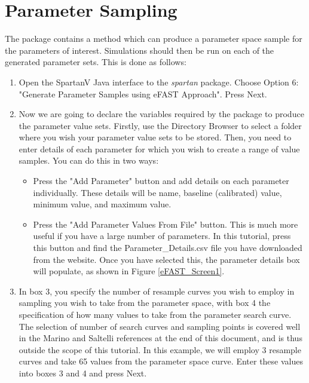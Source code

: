 \documentclass[a4paper,11pt]{article}
\begin{document}
\section{Parameter Sampling}
\noindent The package contains a method which can produce a parameter space sample for the parameters of interest. Simulations should then be run on each of the generated parameter sets.  This is done as follows:\\

\begin{enumerate}
\item Open the SpartanV Java interface to the \textit{spartan} package. Choose Option 6: "Generate Parameter Samples using eFAST Approach". Press Next.
\item Now we are going to declare the variables required by the package to produce the parameter value sets. Firstly, use the Directory Browser to select a folder where you wish your parameter value sets to be stored. Then, you need to enter details of each parameter for which you wish to create a range of value samples. You can do this in two ways:
\begin{itemize}
\item Press the "Add Parameter" button and add details on each parameter individually. These details will be name, baseline (calibrated) value, minimum value, and maximum value.
\item Press the "Add Parameter Values From File" button. This is much more useful if you have a large number of parameters. In this tutorial, press this button and find the Parameter\_Details.csv file you have downloaded from the website. Once you have selected this, the parameter details box will populate, as shown in Figure \ref{eFAST_Screen1}.
\end{itemize}

\item In box 3, you specify the number of resample curves you wish to employ in sampling you wish to take from the parameter space, with box 4 the specification of how many values to take from the parameter search curve. The selection of number of search curves and sampling points is covered well in the Marino and Saltelli references at the end of this document, and is thus outside the scope of this tutorial. In this example, we will employ 3 resample curves and take 65 values from the parameter space curve. Enter these values into boxes 3 and 4 and press Next.


\end{enumerate}
\end{document}
